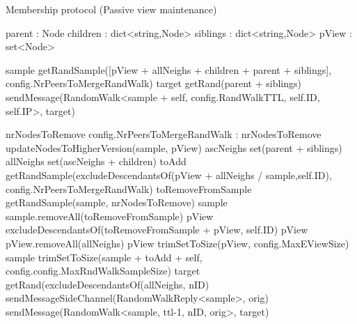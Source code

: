 \begin{algorithm}
\caption{Membership protocol (Passive view maintenance)} \label{alg:memb:passive_view_maint}
\begin{algorithmic}[1]
    
    \asdstate
        \State parent : Node  
        \State children : dict<string,Node>  
        \State siblings : dict<string,Node>  
        \State pView : set<Node> \label{alg:memb:passive_view_maint:state}
    \asdend

     \label{alg:memb:passive_view_maint:walk_trig}
        \State sample \asdassign getRandSample([pView + allNeighs + children + parent + siblings], config.NrPeersToMergeRandWalk)
        \State target \asdassign getRand(parent + siblings)
        \State sendMessage(RandomWalk<sample + self, config.RandWalkTTL, self.ID, self.IP>, target)
    \asdend

     \label{alg:memb:passive_view_maint:walk_rec}
        \State nrNodesToRemove \asdassign config.NrPeersToMergeRandWalk
        :
            \State nrNodesToRemove 
        \EndIf
        \State updateNodesToHigherVersion(sample, pView) \label{alg:memb:passive_view_maint:walk_rec_merge_start}
        \State ascNeighs \asdassign set(parent + siblings)
        \State allNeighs \asdassign set(ascNeighs + children)
        \State toAdd \asdassign getRandSample(excludeDescendantsOf(pView + allNeighs / sample,self.ID), config.NrPeersToMergeRandWalk)
        \State toRemoveFromSample \asdassign getRandSample(sample, nrNodesToRemove)
        \State sample \asdassign sample.removeAll(toRemoveFromSample)
        \State pView \asdassign excludeDescendantsOf(toRemoveFromSample + pView, self.ID)  
        \State pView \asdassign pView.removeAll(allNeighs)
        \State pView \asdassign trimSetToSize(pView, config.MaxEViewSize)
        \State sample  \asdassign trimSetToSize(sample + toAdd + self, config.config.MaxRndWalkSampleSize) \label{alg:memb:passive_view_maint:walk_rec_merge_end}
        \State target \asdassign getRand(excludeDescendantsOf(allNeighs, nID)
         \label{alg:memb:passive_view_maint:walk_rec_send}
            \State sendMessageSideChannel(RandomWalkReply<sample>, orig)
        \Else
            \State sendMessage(RandomWalk<sample, ttl-1, nID, orig>, target)
        \EndIf \label{alg:memb:passive_view_maint:walk_rec_send_end}
    \asdend


\end{algorithmic}
\end{algorithm}
